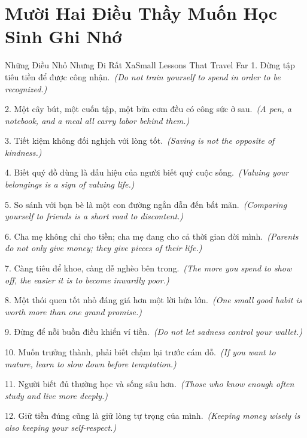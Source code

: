 \section*{Mười Hai Điều Thầy Muốn Học Sinh Ghi Nhớ}
\begin{truyen}{Những Điều Nhỏ Nhưng Đi Rất Xa}{Small Lessons That Travel Far}
1. Đừng tập tiêu tiền để được công nhận.\
\textit{(Do not train yourself to spend in order to be recognized.)}

2. Một cây bút, một cuốn tập, một bữa cơm đều có công sức ở sau.\
\textit{(A pen, a notebook, and a meal all carry labor behind them.)}

3. Tiết kiệm không đối nghịch với lòng tốt.\
\textit{(Saving is not the opposite of kindness.)}

4. Biết quý đồ dùng là dấu hiệu của người biết quý cuộc sống.\
\textit{(Valuing your belongings is a sign of valuing life.)}

5. So sánh với bạn bè là một con đường ngắn dẫn đến bất mãn.\
\textit{(Comparing yourself to friends is a short road to discontent.)}

6. Cha mẹ không chỉ cho tiền; cha mẹ đang cho cả thời gian đời mình.\
\textit{(Parents do not only give money; they give pieces of their life.)}

7. Càng tiêu để khoe, càng dễ nghèo bên trong.\
\textit{(The more you spend to show off, the easier it is to become inwardly poor.)}

8. Một thói quen tốt nhỏ đáng giá hơn một lời hứa lớn.\
\textit{(One small good habit is worth more than one grand promise.)}

9. Đừng để nỗi buồn điều khiển ví tiền.\
\textit{(Do not let sadness control your wallet.)}

10. Muốn trưởng thành, phải biết chậm lại trước cám dỗ.\
\textit{(If you want to mature, learn to slow down before temptation.)}

11. Người biết đủ thường học và sống sâu hơn.\
\textit{(Those who know enough often study and live more deeply.)}

12. Giữ tiền đúng cũng là giữ lòng tự trọng của mình.\
\textit{(Keeping money wisely is also keeping your self-respect.)}
\end{truyen}

